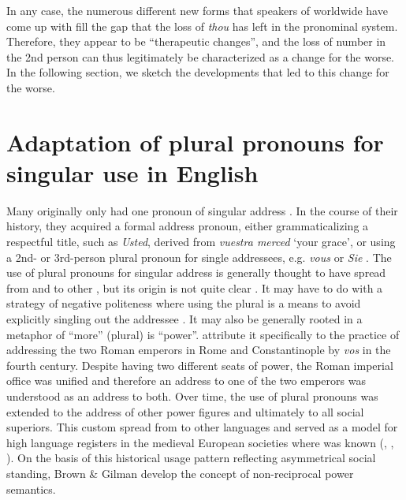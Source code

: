 \documentclass[output=paper,hidelinks]{langscibook}
\begin{document}
In any case, the numerous different new forms that speakers of  worldwide have come up with fill the gap that the loss of \textit{thou} has left in the  pronominal system. Therefore, they appear to be \enquote{therapeutic changes}, and the loss of number in the 2nd person can thus legitimately be characterized as a change for the worse. In the following section, we sketch the developments that led to this change for the worse.

\section{Adaptation of plural pronouns for singular use in English}\label{sec:eh:3}

Many  originally only had one pronoun of singular address \citep[354]{Mazzon2010}. In the course of their history, they acquired a formal address pronoun, either grammaticalizing a respectful title, such as  \textit{Usted}, derived from \textit{vuestra merced} \enquote*{your grace}, or using a 2nd- or 3rd-person plural pronoun for single addressees, e.g.  \textit{vous} or  \textit{Sie} \citep[4]{Jucker2003}. The use of plural pronouns for singular address is generally thought to have spread from  and  to other , but its origin is not quite clear \citep[see][4--5]{Jucker2003}. It may have to do with a strategy of negative politeness where using the plural is a means to avoid explicitly singling out the addressee \citep[widely attested also in languages not influenced by  and  practice, see][198--199]{Brown1987}. It may also be generally rooted in a metaphor of \enquote{more} (plural) is \enquote{power}. \citet[255]{Brown1960} attribute it specifically to the practice of addressing the two Roman emperors in Rome and Constantinople by \textit{vos} in the fourth century. Despite having two different seats of power, the Roman imperial office was unified and therefore an address to one of the two emperors was understood as an address to both. Over time, the use of plural pronouns was extended to the address of other power figures and ultimately to all social superiors. This custom spread from  to other  languages and served as a model for high language registers in the medieval European societies where  was known (\citealt[4--5]{Jucker2003}, \citealt[74]{Jucker2013}, \citealt[354]{Mazzon2010}). On the basis of this historical usage pattern reflecting asymmetrical social standing, Brown \& Gilman develop the concept of non-reciprocal power semantics.
\end{document}
